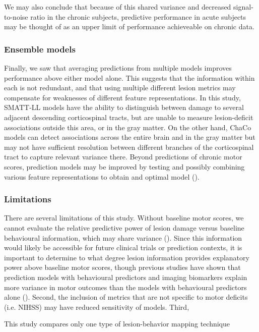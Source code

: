 \documentclass[phd,tocprelim]{cornell}
\begin{document}
We may also conclude that because of this shared variance and decreased signal-to-noise ratio in the chronic subjects, predictive performance in acute subjects may be thought of as an upper limit of performance achieveable on chronic data. 

\subsubsection{Ensemble models}
Finally, we saw that averaging predictions from multiple models improves performance above either model alone. This suggests that the information within each is not redundant, and that using multiple different lesion metrics may compensate for weaknesses of different feature representations. In this study, SMATT-LL models have the ability to distinguish between damage to several adjacent descending corticospinal tracts, but are unable to measure lesion-deficit associations outside this area, or in the gray matter. On the other hand, ChaCo models can detect associations across the entire brain and in the gray matter but may not have sufficient resolution between different branches of the corticospinal tract to capture relevant variance there. Beyond predictions of chronic motor scores, prediction models may be improved by testing and possibly combining various feature representations to obtain and optimal model (\cite{Kasties2021-rm}).

\subsubsection{Limitations}
There are several limitations of this study. Without baseline motor scores, we cannot evaluate the relative predictive power of lesion damage versus baseline behavioural information, which may share variance (\cite{Feng2015-du, Bowren2022-rs}). Since this information would likely be accessible for future clinical trials or prediction contexts, it is important to determine to what degree lesion information provides explanatory power above baseline motor scores, though previous studies have shown that prediction models with behavioural predictors and imaging biomarkers explain more variance in motor outcomes than the models with behavioural predictors alone (\cite{Kim2017-xe, Feng2015-du}). Second, the inclusion of metrics that are not specific to motor deficits (i.e. NIHSS) may have reduced sensitivity of models. Third,

This study compares only one type of lesion-behavior mapping technique 
\end{document}
